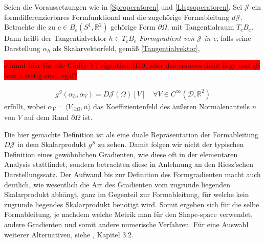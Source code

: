 \begin{defi}[Formgradient]\label{Formgradientdefi}
Seien die Voraussetzungen wie in \ref{Sproperatoren} und \ref{Llsgsoperatoren}.
Sei $\mathcal{J}$ ein formdifferenzierbares Formfunktional und die zugehörige Formableitung $d\mathcal{J}$. Betrachte die zu $c\in B_e(S^1,\mathbb{R}^2)$ gehörige Form $\partial\Omega$, mit Tangentialraum $T_cB_e$. Dann heißt der Tangentialvektor $h\in T_cB_e$ \textit{Formgradient von} $\mathcal{J}$ \textit{in c}, falls seine Darstellung $\alpha_h$ als Skalarvektorfeld, gemäß \ref{Tangentialvektor}, 

\colorbox{red}{stimmt hier für alle Cinfty V? eigentlich H10, aber das ersteres dicht liegt und gS bzw a stetig sind, egal?}

\begin{align}\label{Gradientengleichung}
	g^S(\alpha_h, \alpha_V) = D\mathcal{J}(\Omega)[V] \quad \forall V\in C^\infty(\mathcal{D},\mathbb{R}^2)
\end{align}
erfüllt, wobei $\alpha_V = \langle V_{\vert \partial\Omega}, n\rangle$ das Koeffizientenfeld des äußeren Normalenanteils $n$ von $V$ auf dem Rand $\partial \Omega$ ist.

\end{defi}

Die hier gemachte Definition ist als eine duale Repräsentation der Formableitung $D\mathcal{J}$ in dem Skalarprodukt $g^S$ zu sehen. Damit folgen wir nicht der typischen Definition eines gewöhnlichen Gradienten, wie diese oft in der elementaren Analysis stattfindet, sondern betrachten diese in Anlehnung an den  Riesz'schen Darstellungssatz. Der Aufwand bis zur Definition des Formgradienten macht auch deutlich, wie wesentlich die Art des Gradienten vom zugrunde liegenden Skalarprodukt abhängt, ganz im Gegenteil zur Formableitung, für welche kein zugrunde liegendes Skalarprodukt benötigt wird. Somit ergeben sich für die selbe Formableitung, je nachdem welche Metrik man für den Shape-space verwendet, andere Gradienten und somit andere numerische Verfahren. Für eine Auswahl weiterer Alternativen, siehe \cite{shape_space}, Kapitel 3.2.

